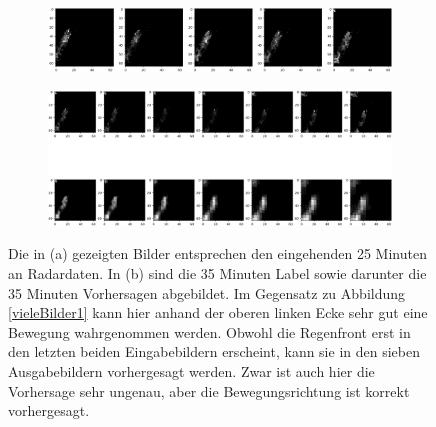 \begin{figure}[]
	\centering
	\begin{subfigure}[]{\linewidth} 
		\centering
		\includegraphics[width=\linewidth]{pics/dt5.png}
		\caption[]{}\label{ga}
	\end{subfigure}
	
	\begin{subfigure}[]{\linewidth} 
		\centering
		\includegraphics[width=\linewidth]{pics/t5.png}
		\caption[]{}\label{gb}
	\end{subfigure}
	
	\caption[Validierungsdaten und Label sowie Vorhersage 2]{Die in (a) gezeigten Bilder entsprechen den eingehenden 25 Minuten an Radardaten. In (b) sind die 35 Minuten Label sowie darunter die 35 Minuten Vorhersagen abgebildet. Im Gegensatz zu Abbildung \ref{vieleBilder1} kann hier anhand der oberen linken Ecke sehr gut eine Bewegung wahrgenommen werden. Obwohl die Regenfront erst in den letzten beiden Eingabebildern erscheint, kann sie in den sieben Ausgabebildern vorhergesagt werden. Zwar ist auch hier die Vorhersage sehr ungenau, aber die Bewegungsrichtung ist korrekt vorhergesagt.}
	\label{vieleBilder2}
\end{figure}



